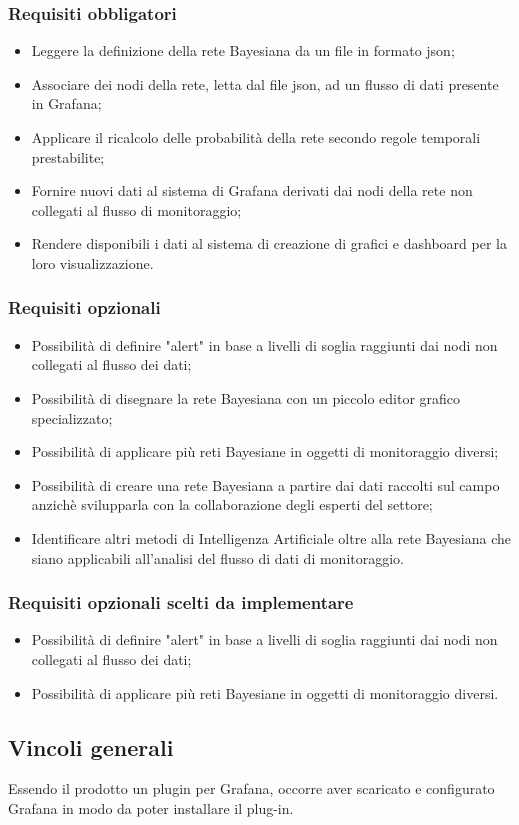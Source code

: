 				\subsubsection{Requisiti obbligatori}
				\begin{itemize}
					\item Leggere la definizione della rete Bayesiana da un file in formato json;
					\item Associare dei nodi della rete, letta dal file json, ad un flusso di dati presente in Grafana;
					\item Applicare il ricalcolo delle probabilità della rete secondo regole temporali prestabilite;
					\item Fornire nuovi dati al sistema di Grafana derivati dai nodi della rete non collegati al flusso di monitoraggio;
					\item Rendere disponibili i dati al sistema di creazione di grafici e dashboard per la loro visualizzazione.
		        \end{itemize}
				\subsubsection{Requisiti opzionali}
				\begin{itemize}
					\item Possibilità di definire "alert\pedice" in base a livelli di soglia raggiunti dai nodi non collegati al flusso dei dati;
					\item Possibilità di disegnare la rete Bayesiana con un piccolo editor grafico specializzato;
					\item Possibilità di applicare più reti Bayesiane in oggetti di monitoraggio diversi;
					\item Possibilità di creare una rete Bayesiana a partire dai dati raccolti sul campo anzichè svilupparla con la collaborazione degli esperti del settore;
					\item Identificare altri metodi di Intelligenza Artificiale oltre alla rete Bayesiana che siano applicabili all'analisi del flusso di dati di monitoraggio.
		        \end{itemize}
		        \subsubsection{Requisiti opzionali scelti da implementare}
				\begin{itemize}
					\item Possibilità di definire "alert" in base a livelli di soglia raggiunti dai nodi non collegati al flusso dei dati;
					\item Possibilità di applicare più reti Bayesiane in oggetti di monitoraggio diversi.
	        	\end{itemize}
				
				
		\subsection{Vincoli generali}			
Essendo il prodotto un plugin per Grafana, occorre aver scaricato e configurato Grafana in modo da poter installare il plug-in.


\newpage
